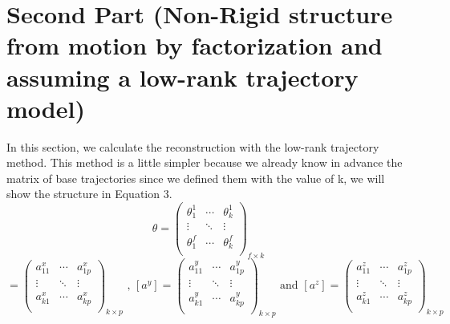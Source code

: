 \section{Second Part (Non-Rigid structure from motion by factorization and assuming a low-rank trajectory model)}
\noindent In this section, we calculate the reconstruction with the low-rank trajectory method. This method is a little simpler because we already know in advance the matrix of base trajectories since we defined them with the value of k, we will show the structure in Equation 3.
\begin{equation*}
	\theta=
	\begin{pmatrix}
		\theta_{1}^{1} &  \cdots & \theta_{k}^{1}\\		
		\vdots &  \ddots & \vdots \\
		\theta_{1}^{f} &  \cdots & \theta_{k}^{f}\\		
	\end{pmatrix}_{f\times k}
\end{equation*}
\begin{equation*}
	[a^{x}]=
	\begin{pmatrix}
		a_{11}^{x} &  \cdots & a_{1p}^{x}\\		
		\vdots &  \ddots & \vdots \\
		a_{k1}^{x} &  \cdots & a_{kp}^{x}\\		
	\end{pmatrix}_{k\times p}\text{ , }
	[a^{y}]=
	\begin{pmatrix}
		a_{11}^{y} &  \cdots & a_{1p}^{y}\\		
		\vdots &  \ddots & \vdots \\
		a_{k1}^{y} &  \cdots & a_{kp}^{y}\\		
	\end{pmatrix}_{k\times p}\text{ and }
	[a^{z}]=
	\begin{pmatrix}
		a_{11}^{z} &  \cdots & a_{1p}^{z}\\		
		\vdots &  \ddots & \vdots \\
		a_{k1}^{z} &  \cdots & a_{kp}^{z}\\		
	\end{pmatrix}_{k\times p}
\end{equation*}

